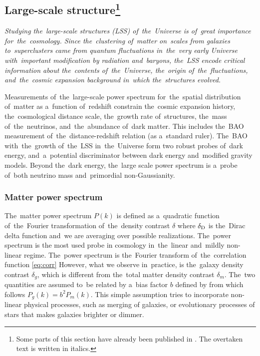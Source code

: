 \subsection[Large-scale structure]{Large-scale structure\footnote{Some parts of this section have already been published in \textcite{mastersthesis_vrastil}. The overtaken text is written in italics.}}
\label{ssec:lss}
{\itshape
Studying the~large-scale structures (LSS) of~the~Universe is of~great importance for~the~cosmology. Since the~clustering of~matter on~scales from galaxies to~superclusters came from quantum fluctuations in~the~very early Universe with~important modification by radiation and~baryons, the~LSS encode critical information about the~contents of~the~Universe, the~origin of~the~fluctuations, and~the~cosmic expansion background in~which the~structures evolved.

Measurements of~the~large-scale power spectrum for~the~spatial distribution of~matter as a~function of~redshift constrain the~cosmic expansion history, the~cosmological distance scale, the~growth rate of~structures, the~mass of~the~neutrinos, and~the~abundance of~dark matter. This includes the~BAO measurement of~the~distance-redshift relation (as a~standard ruler). The~BAO with~the~growth of~the~LSS in~the~Universe form two robust probes of~dark energy, and~a~potential discriminator between dark energy and~modified gravity models. Beyond the~dark energy, the~large scale power spectrum is a~probe of~both neutrino mass and~primordial non-Gaussianity.
}
\subsubsection{Matter power spectrum}
The~matter power spectrum $P(k)$ is defined as a~quadratic function of~the~Fourier transformation of~the~density contrast $\delta$ \parencite{2010deto.book.....A}
where $\delta_{\rm D}$ is the~Dirac delta function and~we are averaging over possible realizations. The~power spectrum is the most used probe in cosmology in~the~linear and~mildly non-linear regime. The~power spectrum is the~Fourier transform of~the~correlation function \eqref{eq:corr}
However, what we observe in~practice, is the~galaxy density contrast $\delta_g$, which is different from the~total matter density contrast $\delta_m$. The~two quantities are assumed to~be related by a~bias factor $b$ defined by \parencite{2010deto.book.....A}
from which follows $P_g(k)=b^2P_m(k)$. This simple assumption tries to incorporate non-linear physical processes, such as merging of galaxies, or evolutionary processes of stars that makes galaxies brighter or dimmer.

